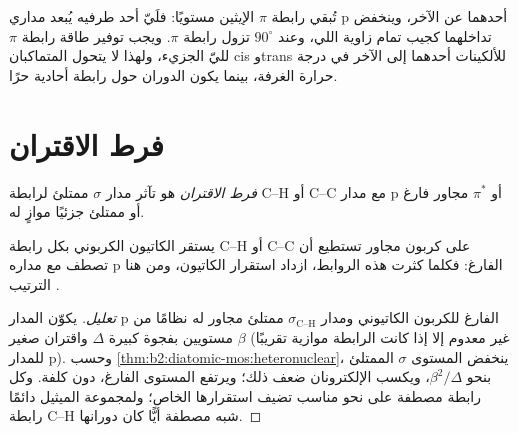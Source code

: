 تُبقي رابطة $\pi$ الإيثين مستويًا: فلَيّ أحد طرفيه يُبعد مداري p أحدهما عن
الآخر، وينخفض تداخلهما كجيب تمام زاوية اللي، وعند $90^\circ$
تزول رابطة $\pi$. ويجب توفير طاقة رابطة $\pi$ لليّ
الجزيء، ولهذا لا يتحول المتماكبان cis وtrans للألكينات أحدهما إلى الآخر في
درجة حرارة الغرفة، بينما يكون الدوران حول رابطة أحادية حرًا.

\section{فرط الاقتران}

\begin{definition}\label{def:b2:fragment-orbitals:hyperconjugation}
\emph{فرط الاقتران} هو تآثر مدار $\sigma$
ممتلئ لرابطة C--H أو C--C مع مدار p أو $\pi^*$ مجاور فارغ أو ممتلئ
جزئيًا موازٍ له.
\end{definition}

\begin{proposition}\label{prop:b2:fragment-orbitals:hyperconjugation}
يستقر الكاتيون الكربوني بكل رابطة C--H أو C--C على كربون مجاور
تستطيع أن تصطف مع مداره p الفارغ: فكلما كثرت هذه الروابط، ازداد استقرار
الكاتيون، ومن هنا الترتيب .
\end{proposition}

\begin{proof}[تعليل]
يكوّن المدار p الفارغ للكربون الكاتيوني ومدار $\sigma_{\text{C--H}}$ ممتلئ
مجاور له نظامًا من مستويين بفجوة كبيرة $\Delta$ واقتران صغير
$\beta$ (غير معدوم إلا إذا كانت الرابطة موازية تقريبًا للمدار p). وحسب
\cref{thm:b2:diatomic-mos:heteronuclear}، ينخفض المستوى $\sigma$ الممتلئ بنحو
$\beta^2/\Delta$، ويكسب الإلكترونان ضعف ذلك؛ ويرتفع المستوى الفارغ، دون
كلفة. وكل رابطة مصطفة على نحو مناسب تضيف استقرارها الخاص؛ ولمجموعة الميثيل
دائمًا رابطة C--H شبه مصطفة أيًّا كان دورانها.
\end{proof}


